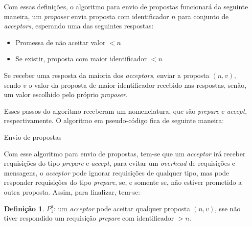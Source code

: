\documentclass[12pt,
openright, 
oneside,
a4paper,
brazil]{facom-ufu-abntex2}
\theoremstyle{definition}
\newtheorem*{definition}{Definição}
\begin{document}
Com essas definições, o algoritmo para envio de propostas funcionará da seguinte maneira,
um \textit{proposer} envia proposta com identificador $n$ para conjunto de 
\textit{acceptors}, esperando uma das seguintes respostas:

\begin{itemize}
    \item Promessa de não aceitar valor $<n$
    \item Se existir, proposta com maior identificador $<n$
\end{itemize}

Se receber uma resposta da maioria dos \textit{acceptors}, enviar a proposta
$(n, v)$, sendo $v$ o valor da proposta de maior identificador recebido nas respostas,
senão, um valor escolhido pelo próprio \textit{proposer}.

Esses passos do algoritmo receberam um nomenclatura, que são \textit{prepare} e
\textit{accept}, respectivamente. O algoritmo em pseudo-código fica de seguinte maneira:

\begin{algorithm}[H]
\caption{Envio de propostas}
\SetAlgoLined
{}
\end{algorithm}

Com esse algoritmo para envio de propostas, tem-se que um \textit{acceptor} irá
receber requisições do tipo \textit{prepare} e \textit{accept}, para evitar um \textit{overhead}
de requisições e mensagens, o \textit{acceptor} pode ignorar requisições de qualquer tipo,
mas pode responder requisições do tipo \textit{prepare}, se, e somente se, não estiver
prometido a outra proposta. Assim, para finalizar, tem-se:

\begin{definition}
$P_1^a$: um \textit{acceptor} pode aceitar qualquer proposta $(n, v)$, sse não tiver
respondido um requisição \textit{prepare} com identificador $>n$.
\end{definition}
\end{document}

